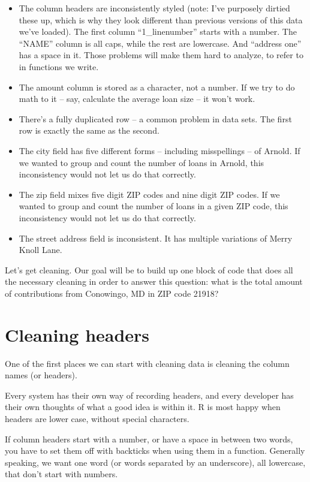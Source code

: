 \documentclass[
  letterpaper,
  DIV=11,
  numbers=noendperiod]{scrreprt}
\providecommand{\tightlist}{%
  \setlength{\itemsep}{0pt}\setlength{\parskip}{0pt}}\usepackage{longtable,booktabs,array}
\begin{document}
\begin{itemize}
\tightlist
\item
  The column headers are inconsistently styled (note: I've purposely
  dirtied these up, which is why they look different than previous
  versions of this data we've loaded). The first column
  ``1\_linenumber'' starts with a number. The ``NAME'' column is all
  caps, while the rest are lowercase. And ``address one'' has a space in
  it. Those problems will make them hard to analyze, to refer to in
  functions we write.
\item
  The amount column is stored as a character, not a number. If we try to
  do math to it -- say, calculate the average loan size -- it won't
  work.
\item
  There's a fully duplicated row -- a common problem in data sets. The
  first row is exactly the same as the second.
\item
  The city field has five different forms -- including misspellings --
  of Arnold. If we wanted to group and count the number of loans in
  Arnold, this inconsistency would not let us do that correctly.
\item
  The zip field mixes five digit ZIP codes and nine digit ZIP codes. If
  we wanted to group and count the number of loans in a given ZIP code,
  this inconsistency would not let us do that correctly.
\item
  The street address field is inconsistent. It has multiple variations
  of Merry Knoll Lane.
\end{itemize}

Let's get cleaning. Our goal will be to build up one block of code that
does all the necessary cleaning in order to answer this question: what
is the total amount of contributions from Conowingo, MD in ZIP code
21918?

\hypertarget{cleaning-headers}{%
\section{Cleaning headers}\label{cleaning-headers}}

One of the first places we can start with cleaning data is cleaning the
column names (or headers).

Every system has their own way of recording headers, and every developer
has their own thoughts of what a good idea is within it. R is most happy
when headers are lower case, without special characters.

If column headers start with a number, or have a space in between two
words, you have to set them off with backticks when using them in a
function. Generally speaking, we want one word (or words separated by an
underscore), all lowercase, that don't start with numbers.
\end{document}
